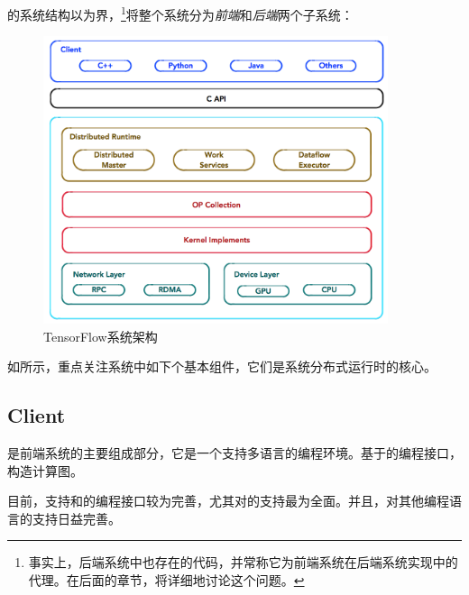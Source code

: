 \begin{content}

\tf{}的系统结构以\emph{}为界，\footnote{事实上，后端系统中也存在的代码，并常称它为前端系统在后端系统实现中的代理。在后面的章节，将详细地讨论这个问题。}将整个系统分为\emph{前端}和\emph{后端}两个子系统：

\begin{enum}
\end{enum}

\begin{figure}[!htbp]
\centering
\includegraphics[width=0.9\textwidth]{figures/tf-architecture.png}
\caption{TensorFlow系统架构}
 \label{fig:tf-architecture}
\end{figure}

如所示，重点关注系统中如下个基本组件，它们是系统分布式运行时的核心。

\subsection{Client}

是前端系统的主要组成部分，它是一个支持多语言的编程环境。基于的编程接口，构造计算图。

目前，支持和的编程接口较为完善，尤其对的支持最为全面。并且，对其他编程语言的支持日益完善。


\end{content}
